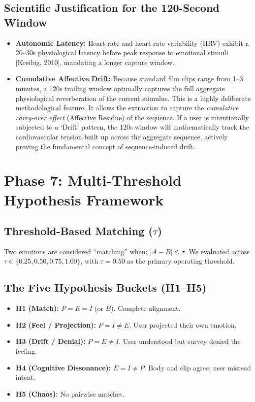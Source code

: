 \documentclass[11pt, a4paper]{report}
\begin{document}
\subsection{Scientific Justification for the 120-Second Window}
\begin{itemize}
    \item \textbf{Autonomic Latency:} Heart rate and heart rate variability (HRV) exhibit a 20--30s physiological latency before peak response to emotional stimuli [Kreibig, 2010], mandating a longer capture window.
    \item \textbf{Cumulative Affective Drift:} Because standard film clips range from 1--3 minutes, a 120s trailing window optimally captures the full aggregate physiological reverberation of the current stimulus. This is a highly deliberate methodological feature. It allows the extraction to capture the \textit{cumulative carry-over effect} (Affective Residue) of the sequence. If a user is intentionally subjected to a `Drift' pattern, the 120s window will mathematically track the cardiovascular tension built up across the aggregate sequence, actively proving the fundamental concept of sequence-induced drift.
\end{itemize}

\section{Phase 7: Multi-Threshold Hypothesis Framework}
\subsection{Threshold-Based Matching ($\tau$)}
Two emotions are considered ``matching'' when: $|A - B| \leq \tau$. We evaluated across $\tau \in \{0.25, 0.50, 0.75, 1.00\}$, with $\tau = 0.50$ as the primary operating threshold.

\subsection{The Five Hypothesis Buckets (H1--H5)}
\begin{itemize}
    \item \textbf{H1 (Match):} $P = E = I$ (or $B$). Complete alignment.
    \item \textbf{H2 (Feel / Projection):} $P = I \neq E$. User projected their own emotion.
    \item \textbf{H3 (Drift / Denial):} $P = E \neq I$. User understood but survey denied the feeling.
    \item \textbf{H4 (Cognitive Dissonance):} $E = I \neq P$. Body and clip agree; user misread intent.
    \item \textbf{H5 (Chaos):} No pairwise matches.
\end{itemize}
\end{document}
